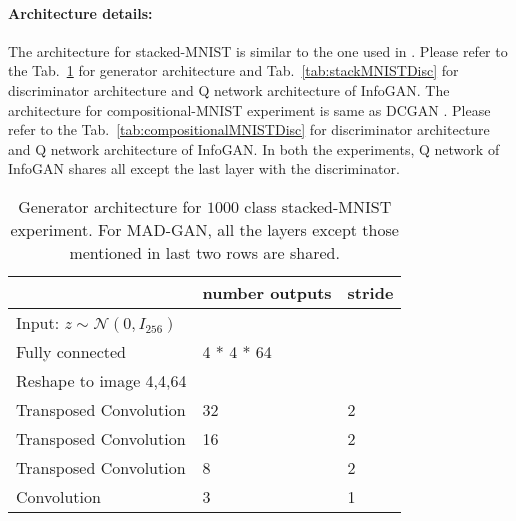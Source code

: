 \paragraph{Architecture details:} The architecture for stacked-MNIST is similar to the one used in \cite{metz2017unrolledGAN}. Please refer to the Tab.~\ref{tab:stackMNISTGen} for generator architecture and Tab.~\ref{tab:stackMNISTDisc} for discriminator architecture and Q network architecture of InfoGAN. The architecture for compositional-MNIST experiment is same as DCGAN \cite{radford2015unsupervised}. Please refer to the Tab.~\ref{tab:compositionalMNISTDisc} for discriminator architecture and Q network architecture of InfoGAN. In both the experiments, Q network of InfoGAN shares all except the last layer with the discriminator.
\begin{center}
	\begin{table}
		\begin{tabular}{| m{12em} | m{4em} | m{4em} |} 
			\hline
			& \textbf{number outputs} & \textbf{stride} \\
			\hline
			Input: $z \sim \mathcal{N}(0, I_{256})$ & & \\ 
			\hline
			Fully connected & 4 * 4 * 64 & \\ 
			\hline
			Reshape to image 4,4,64 & & \\
			\hline
			Transposed Convolution & 32 & 2 \\
			\hline
			Transposed Convolution & 16 & 2 \\
			\hline
			Transposed Convolution & 8 & 2 \\
			\hline
			Convolution & 3 & 1 \\
			\hline
		\end{tabular}
		\caption{\label{tab:stackMNISTGen}Generator architecture for $1000$ class stacked-MNIST experiment. For MAD-GAN, all the layers except those mentioned in last two rows are shared.}
	\end{table}
\end{center}

